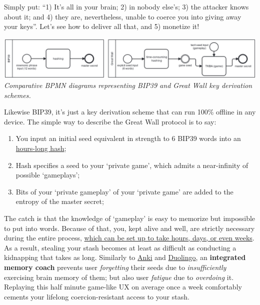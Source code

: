 \documentclass[8pt]{article}
\newcommand{\faqurl}{https://tr.ee/gwfaq}
\begin{document}
\noindent
Simply put: ``1) It's all in your brain; 2) in nobody else's; 3) the attacker knows about it; and 4) they are, nevertheless, unable to coerce you into giving away your keys''. Let's see how to deliver all that, and 5) monetize it!

\begin{center}
    \includegraphics[width=1\textwidth]{gw-one-pager-diagram.png}
    \textit{Comparative BPMN diagrams representing BIP39 and Great Wall key derivation schemes.}
\end{center}

\noindent
Likewise BIP39, it's just a key derivation scheme that can run 100\% offline in any device. The simple way to describe the Great Wall protocol is to say:

\begin{enumerate}
 \item You input an initial seed equivalent in strength to 6 BIP39 words into an \href{\faqurl}{hours-long hash};
 \item Hash specifies a seed to your `private game', which admits a near-infinity of possible `gameplays';
 \item Bits of your `private gameplay' of your `private game' are added to the entropy of the master secret;
\end{enumerate}

\noindent
The catch is that the knowledge of `gameplay' is easy to memorize but impossible to put into words. Because of that, you, kept alive and well, are strictly necessary during the entire process, \href{\faqurl}{which can be set up to take hours, days, or even weeks}. As a result, stealing your stash becomes at least as difficult as conducting a kidnapping that takes as long. Similarly to \href{https://apps.ankiweb.net/}{Anki} and \href{https://www.duolingo.com/}{Duolingo}, an \textbf{integrated memory coach} prevents user \textit{forgetting} their seeds due to \textit{insufficiently} exercising brain memory of them; but also user \textit{fatigue} due to \textit{overdoing} it. Replaying this half minute game-like UX on average once a week comfortably cements your lifelong coercion-resistant access to your stash.

\vspace{0.3cm}
\end{document}
